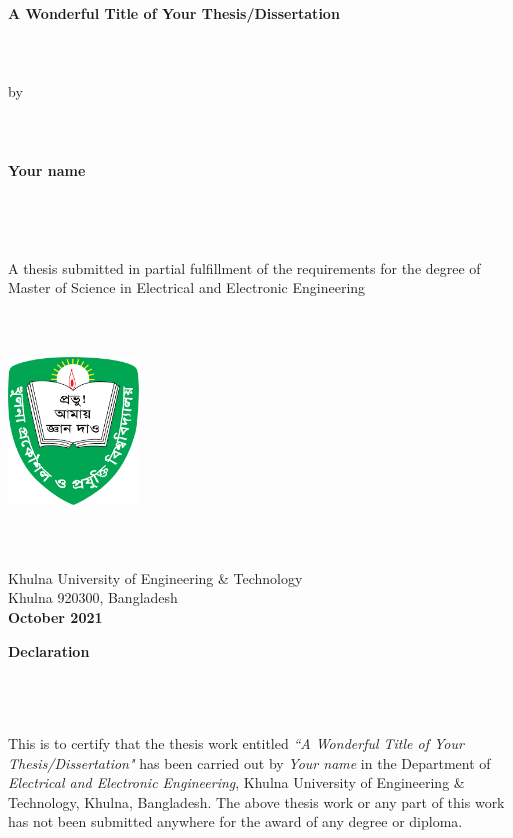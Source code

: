 \documentclass[a4paper,12pt,oneside]{book}
\newcommand{\blanklineR}{\hfill \\} %
\newcommand{\HeadingR}[1]{%
{\large			%
\bfseries{#1}}}
\newcommand{\titleR}{A Wonderful Title of Your Thesis/Dissertation}		%
\begin{document}
\frontmatter
\begin{titlepage}
{}		%
\centering
\HeadingR{\titleR}\\
\blanklineR\blanklineR\blanklineR
by\\
\blanklineR\blanklineR\blanklineR
\textbf{Your name}\\
\blanklineR\blanklineR\blanklineR\blanklineR
A thesis submitted in partial fulfillment of the requirements for the degree of \\
Master of Science in Electrical and Electronic Engineering\\
\blanklineR\blanklineR\blanklineR
\includegraphics[width=0.26\textwidth]{Figures/logo.png}\\
\blanklineR\blanklineR\blanklineR
Khulna University of Engineering \& Technology\\
Khulna 920300, Bangladesh\\
\textbf{October 2021}
\end{titlepage}

\newpage
\addtocounter{page}{1}	%
 \label{declar}

\begin{center}
\HeadingR{Declaration}\\
\end{center}
\blanklineR\blanklineR\blanklineR
This is to certify that the thesis work entitled \textit{``\titleR"} has been carried out by \textit{Your name} in the Department of \textit{Electrical and Electronic Engineering}, Khulna University of Engineering \& Technology, Khulna, Bangladesh. The above thesis work or any part of this work has not been submitted anywhere for the award of any degree or diploma.\\[2cm]
\end{document}
